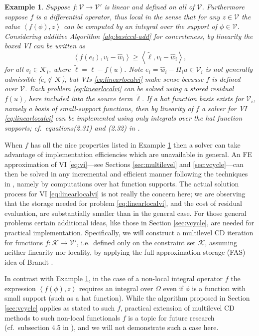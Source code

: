 \documentclass[letterpaper,final,12pt,reqno]{amsart}
\theoremstyle{cstyle}
\theoremstyle{cstyle*}
\theoremstyle{dstyle}
\newtheorem{example}[theorem]{Example}
\numberwithin{equation}{section}
\numberwithin{figure}{section}
\numberwithin{table}{section}
\numberwithin{theorem}{section}
\newcommand{\cK}{\mathcal{K}}
\newcommand{\cV}{\mathcal{V}}
\newcommand{\ip}[2]{\left<#1,#2\right>}
\begin{document}
\begin{example}  \label{ex:fnice} Suppose $f:\cV \to \cV'$ is linear and defined on all of $\cV$.  Furthermore suppose $f$ is a differential operator, thus local in the sense that for any $z\in\mathcal{V}$ the value $\ip{f(\phi)}{z}$ can be computed by an integral over the support of $\phi \in \mathcal{V}$.  Considering additive Algorithm \ref{alg:basiccd-add} for concreteness, by linearity the boxed VI can be written as
\begin{equation}
\ip{f(e_i)}{v_i-\hat w_i} \ge \ip{\tilde\ell}{v_i-\hat w_i}, \label{eq:linearlocalvi}
\end{equation}
for all $v_i \in \mathcal{K}_i$, where $\tilde\ell = \ell - f(u)$.  Note $e_i = \hat w_i - \Pi_i u \in \cV_i$ is not generally admissible ($e_i \notin \cK$), but VIs \eqref{eq:linearlocalvi} make sense because $f$ is defined over $\cV$.  Each problem \eqref{eq:linearlocalvi} can be solved using a stored residual $f(u)$, here included into the source term $\tilde\ell$.  If a hat function basis exists for $\cV_i$, namely a basis of small-support functions, then by linearity of $f$ a solver for VI \eqref{eq:linearlocalvi} can be implemented using only integrals over the hat function supports; cf.~equations(2.31) and (2.32) in \cite{Farrelletal2021}.
\end{example}

When $f$ has all the nice properties listed in Example \ref{ex:fnice} then a solver can take advantage of implementation efficiencies which are unavailable in general.  An FE approximation of VI \eqref{eq:vi}---see Sections \ref{sec:multilevel} and \ref{sec:vcycle}---can then be solved in any incremental and efficient manner following the techniques in \cite{GraeserKornhuber2009,Tai2003}, namely by computations over hat function supports.  The actual solution process for VI \eqref{eq:linearlocalvi} is not really the concern here; we are observing that the storage needed for problem \eqref{eq:linearlocalvi}, and the cost of residual evaluation, are substantially smaller than in the general case.  For those general problems certain additional ideas, like those in Section \ref{sec:vcycle}, are needed for practical implementation.  Specifically, we will construct a multilevel CD iteration for functions $f:\cK\to\cV'$, i.e.~defined only on the constraint set $\cK$, assuming neither linearity nor locality, by applying the full approximation storage (FAS) idea of Brandt \cite{Brandt1977}.

In contrast with Example \ref{ex:fnice}, in the case of a non-local integral operator $f$ the expression $\ip{f(\phi)}{z}$ requires an integral over $\Omega$ even if $\phi$ is a function with small support (such as a hat function).  While the algorithm proposed in Section \ref{sec:vcycle} applies as stated to such $f$, practical extension of multilevel CD methods to such non-local functionals $f$ is a topic for future research (cf.~subsection 4.5 in \cite{Bueler2021conservation}), and we will not demonstrate such a case here.
\end{document}
